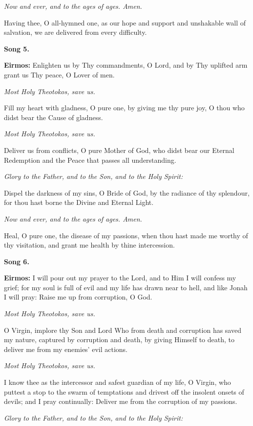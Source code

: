 \emph{Now and ever, and to the ages of ages. Amen.}

Having thee, O all-hymned one, as our hope and support and unshakable wall of salvation, we are delivered from every difficulty.

\textbf{Song 5.}

\textbf{Eirmos:} 
Enlighten us by Thy commandments, O Lord, and by Thy uplifted arm grant us Thy peace, O Lover of men.

\emph{Most Holy Theotokos, save us.}

Fill my heart with gladness, O pure one, by giving me thy pure joy, O thou who didst bear the Cause of gladness.

\emph{Most Holy Theotokos, save us.}

Deliver us from conflicts, O pure Mother of God, who didst bear our Eternal Redemption and the Peace that passes all understanding.

\emph{Glory to the Father, and to the Son, and to the Holy Spirit:}

Dispel the darkness of my sins, O Bride of God, by the radiance of thy splendour, for thou hast borne the Divine and Eternal Light.

\emph{Now and ever, and to the ages of ages. Amen.}

Heal, O pure one, the disease of my passions, when thou hast made me worthy of thy visitation, and grant me health by thine intercession.

\textbf{Song 6.}

\textbf{Eirmos:} 
I will pour out my prayer to the Lord, and to Him I will confess my grief; 
for my soul is full of evil and my life has drawn near to hell, and like Jonah I will pray: 
Raise me up from corruption, O God.

\emph{Most Holy Theotokos, save us.}

O Virgin, implore thy Son and Lord Who from death and corruption has saved my nature, captured by corruption and death, by giving Himself to death, to deliver me from my enemies' evil actions.

\emph{Most Holy Theotokos, save us.}

I know thee as the intercessor and safest guardian of my life, O Virgin, who puttest a stop to the swarm of temptations and drivest off the insolent onsets of devils; 
and I pray continually: Deliver me from the corruption of my passions.

\emph{Glory to the Father, and to the Son, and to the Holy Spirit:}

